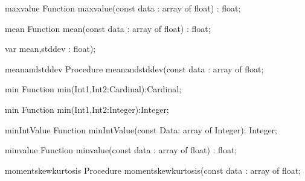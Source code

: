 \FPCexample{}


\begin{function}{maxvalue}
\Declaration
Function maxvalue(const data : array of float) : float;
\Description

\Errors
\SeeAlso
\end{function}

\FPCexample{}


\begin{function}{mean}
\Declaration
Function mean(const data : array of float) : float;
\Description

\Errors
\SeeAlso
\end{function}

\FPCexample{}


  var mean,stddev : float);
\begin{procedure}{meanandstddev}
\Declaration
Procedure meanandstddev(const data : array of float;
\Description

\Errors
\SeeAlso
\end{procedure}

\FPCexample{}


\begin{function}{min}
\Declaration
Function min(Int1,Int2:Cardinal):Cardinal;
\Description

\Errors
\SeeAlso
\end{function}

\FPCexample{}


\begin{function}{min}
\Declaration
Function min(Int1,Int2:Integer):Integer;
\Description

\Errors
\SeeAlso
\end{function}

\FPCexample{}


\begin{function}{minIntValue}
\Declaration
Function minIntValue(const Data: array of Integer): Integer;
\Description

\Errors
\SeeAlso
\end{function}

\FPCexample{}


\begin{function}{minvalue}
\Declaration
Function minvalue(const data : array of float) : float;
\Description

\Errors
\SeeAlso
\end{function}

\FPCexample{}


\begin{procedure}{momentskewkurtosis}
\Declaration
Procedure momentskewkurtosis(const data : array of float;
\Description

\Errors
\SeeAlso
\end{procedure}

